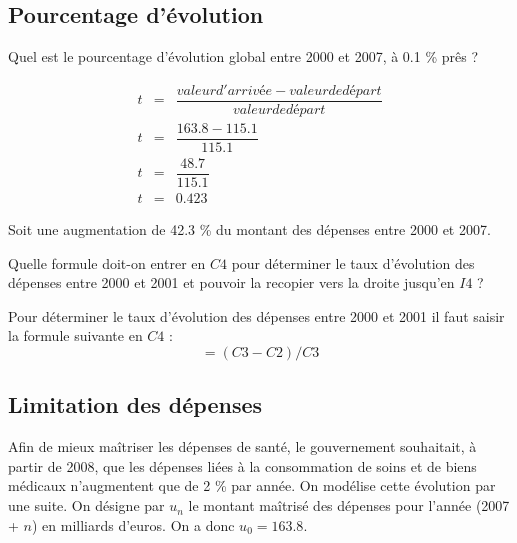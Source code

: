 \subsection{Pourcentage d'évolution}

\begin{questions}
	\question[1] Quel est le pourcentage d'évolution global entre 2000 et 2007, à \num{0.1} \% prês ? 
	\begin{solution}
		\begin{eqnarray*}
			t &=& \dfrac{valeur d'arrivée - valeur de départ}{valeur de départ} \\
			t &=& \dfrac{\num{163.8} - \num{115.1}}{\num{115.1}} \\
			t &=& \dfrac{\num{48.7}}{\num{115.1}} \\
			t &=& \num{0.423}
		\end{eqnarray*}
	
		Soit une augmentation de \num{42.3} \% du montant des dépenses entre 2000 et 2007.
	\end{solution}

	\question[1] Quelle formule doit-on entrer en $C4$ pour déterminer le taux d'évolution des dépenses entre 2000 et 2001 et pouvoir la recopier vers la droite jusqu'en $I4$ ?
	\begin{solution}
		Pour déterminer le taux d'évolution des dépenses entre 2000 et 2001 il faut saisir la formule suivante en $C4$  :
		\begin{equation*}
			= (C3 - C2) / C3
		\end{equation*}
	\end{solution}
\end{questions}

\subsection{Limitation des dépenses}

Afin de mieux maîtriser les dépenses de santé, le gouvernement souhaitait, à partir de 2008, que les dépenses liées à la consommation de soins et de biens médicaux n'augmentent que de 2 \% par année. On modélise cette évolution par une suite. On désigne par $u_n$ le montant maîtrisé des dépenses pour l'année (2007 + $n$) en milliards d'euros. On a donc $u_0 = \num{163.8}$.

